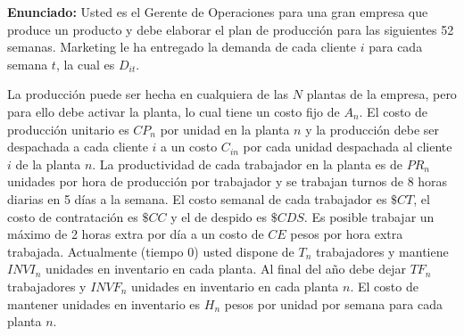 \documentclass[11pt, a4paper]{article}
\begin{document}
  \textbf{Enunciado:}
  Usted es el Gerente de Operaciones para una gran empresa que produce un producto y debe elaborar el plan de producción para las siguientes 52 semanas. Marketing le ha entregado la demanda de cada cliente $i$ para cada semana $t$, la cual es $D_{it}$.
  
  La producción puede ser hecha en cualquiera de las $N$ plantas de la empresa, pero para ello debe activar la planta, lo cual tiene un costo fijo de $A_n$. El costo de producción unitario es $CP_n$ por unidad en la planta $n$ y la producción debe ser despachada a cada cliente $i$ a un costo $C_{in}$ por cada unidad despachada al cliente $i$ de la planta $n$. La productividad de cada trabajador en la planta es de $PR_n$ unidades por hora de producción por trabajador y se trabajan turnos de 8 horas diarias en 5 días a la semana. El costo semanal de cada trabajador es $\$CT$, el costo de contratación es $\$CC$ y el de despido es $\$CDS$. Es posible trabajar un máximo de 2 horas extra por día a un costo de $CE$ pesos por hora extra trabajada. Actualmente (tiempo 0) usted dispone de $T_n$ trabajadores y mantiene $INVI_n$ unidades en inventario en cada planta. Al final del año debe dejar $TF_n$ trabajadores y $INVF_n$ unidades en inventario en cada planta $n$. El costo de mantener unidades en inventario es $H_n$ pesos por unidad por semana para cada planta $n$.
\end{document}
